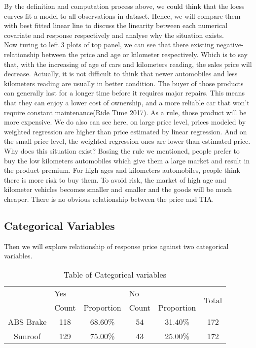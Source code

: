\documentclass[a4paper]{article}
\begin{document}
\noindent
By the definition and computation process above, we could think that the loess curves fit a model to all observations in dataset. Hence, we will compare them with best fitted linear line to discuss the linearity between each numerical covariate and response respectively and analyse why the situation exists.\\

\noindent 
Now turing to left 3 plots of top panel, we can see that there existing negative-relationship between the price and age or kilometer respectively. Which is to say that, with the increasing of age of cars and kilometers reading, the sales price will decrease. Actually, it is not difficult to think that newer automobiles and less kilometers reading are usually in better condition. The buyer of those products can generally last for a longer time before it requires major repairs. This means that they can enjoy a lower cost of ownership, and a more reliable car that won’t require constant maintenance(Ride Time 2017). As a rule, those product will be more expensive. We do also can see here, on large price level, prices modeled by weighted regression are higher than price estimated by linear regression. And on the small price level, the weighted regression ones are lower than estimated price. Why does this situation exist? Basing the rule we mentioned, people prefer to buy the low kilometers automobiles which give them a large market and result in the product premium. For high ages and kilometers automobiles, people think there is more risk to buy them. To avoid risk, the market of high age and kilometer vehicles becomes smaller and smaller and the goods will be much cheaper. There is no obvious relationship between the price and TIA. \\

\subsection{Categorical Variables}
Then we will explore relationship of response price against two categorical variables.
\begin{table}[!htb]
\centering
\begin{tabular}{c|cc|cc|c}
\toprule
          & \multicolumn{2}{l}{Yes} & \multicolumn{2}{l}{No} & \multirow{2}{*}{Total} \\
          & Count    & Proportion   & Count   & Proportion   &                        \\
\midrule
ABS Brake & 118      & 68.60\%      & 54      & 31.40\%      & 172                    \\
Sunroof   & 129      & 75.00\%      & 43      & 25.00\%      & 172                    \\
\bottomrule
\end{tabular}
    \caption{Table of Categorical variables}
    \label{tab:my_label}
\end{table}
\end{document}
